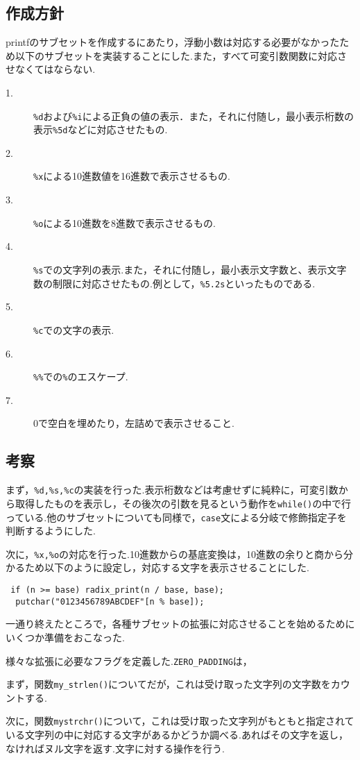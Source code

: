 \documentclass[a4j,11pt]{jarticle}
\begin{document}
  \subsection{作成方針}
printfのサブセットを作成するにあたり，浮動小数は対応する必要がなかったため以下のサブセットを実装することにした.また，すべて可変引数関数に対応させなくてはならない.
\begin{description}
\item[1.]\verb|%d|および\verb|%i|による正負の値の表示．また，それに付随し，最小表示桁数の表示\verb|%5d|などに対応させたもの.
\item[2.]\verb|%x|による10進数値を16進数で表示させるもの.
\item[3.]\verb|%o|による10進数を8進数で表示させるもの.
\item[4.]\verb|%s|での文字列の表示.また，それに付随し，最小表示文字数と、表示文字数の制限に対応させたもの.例として，\verb|%5.2s|といったものである.
\item[5.]\verb|%c|での文字の表示.
\item[6.]\verb|%%|での\verb|%|のエスケープ.
\item[7.]0で空白を埋めたり，左詰めで表示させること.
\end{description}
  \subsection{考察}
まず，\verb|%d,%s,%c|の実装を行った.表示桁数などは考慮せずに純粋に，可変引数から取得したものを表示し，その後次の引数を見るという動作を\verb|while()|の中で行っている.他のサブセットについても同様で，\verb|case|文による分岐で修飾指定子を判断するようにした.

次に，\verb|%x,%o|の対応を行った.10進数からの基底変換は，10進数の余りと商から分かるため以下のように設定し，対応する文字を表示させることにした.
\begin{verbatim}
 if (n >= base) radix_print(n / base, base);
  putchar("0123456789ABCDEF"[n % base]);
\end{verbatim}

一通り終えたところで，各種サブセットの拡張に対応させることを始めるためにいくつか準備をおこなった.

様々な拡張に必要なフラグを定義した.\verb|ZERO_PADDING|は，

まず，関数\verb|my_strlen()|についてだが，これは受け取った文字列の文字数をカウントする.

次に，関数\verb|mystrchr()|について，これは受け取った文字列がもともと指定されている文字列の中に対応する文字があるかどうか調べる.あればその文字を返し，なければヌル文字を返す.文字に対する操作を行う.
\end{document}
